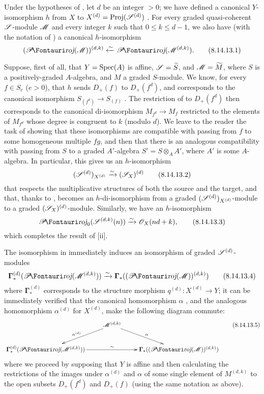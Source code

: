 \begin{remark}[8.14.13]
\label{II.8.14.13}
Under the hypotheses of , let $d$ be an integer $>0$;
we have defined a canonical $Y$-isomorphism $h$ from $X$ to $X^{(d)}=\operatorname{Proj}(\mathscr{S}^{(d)})$ .
For every
graded quasi-coherent $\mathscr{S}$-module $\mathscr{M}$ and every integer $k$ such that $0\leq k\leq d-1$, we also have (with the notation of ) a canonical $h$-isomorphism
\[
\label{II.8.14.13.1}
    (\shProj(\sh{M}))^{(d,k)} \xleftarrow{\sim} \shProj(\sh{M}^{(d,k)}).
\tag{8.14.13.1}
\]

Suppose, first of all, that $Y=\operatorname{Spec}(A)$ is affine, $\mathscr{S}=\widetilde{S}$, and $\mathscr{M}=\widetilde{M}$, where $S$ is a positively-graded $A$-algebra, and $M$ a graded $S$-module.
We know, for every $f\in S_e$ ($e>0$), that $h$ sends $D_+(f)$ to $D_+(f^d)$, and corresponds to the canonical isomorphism $S_{(f^d)}\to S_{(f)}$ .
The restriction of  to $D_+(f^d)$ then corresponds to the canonical di-isomorphism $M_{f^d}\to M_f$ restricted to the elements of $M_{f^d}$ whose degree is congruent to $k$ (modulo $d$).
We leave to the reader the task of showing that these isomorphisms are compatible with passing from $f$ to some homogeneous multiple $fg$, and then that there is an analogous compatibility with passing from $S$ to a graded $A'$-algebra $S'=S\otimes_A A'$, where $A'$ is some $A$-algebra.
In particular, this gives us an $h$-isomorphism
\[
\label{II.8.14.13.2}
    (\mathscr{S}^{(d)})_{X^{(d)}} \xrightarrow{\sim} (\mathscr{S}_X)^{(d)}
\tag{8.14.13.2}
\]
that respects the multiplicative structures of both the source and the target, and that, thanks to , becomes an $h$-di-isomorphism from a graded $(\mathscr{S}^{(d)})_{X^{(d)}}$-module to a graded $(\mathscr{S}_X)^{(d)}$-module.
Similarly, we have an $h$-isomorphism
\[
\label{II.8.14.13.3}
    \shProj_0(\sh{S}^{(d,k)}(n)) \simto \sh{O}_X(nd+k),
\tag{8.14.13.3}
\]
which completes the result of [ii].

The isomorphism in  immediately induces an isomorphism of graded $\mathscr{S}^{(d)}$-modules
\[
\label{II.8.14.13.4}
    \boldsymbol{\Gamma}_*^{(d)}(\shProj(\sh{M}^{(d,k)})) \simto \boldsymbol{\Gamma}_*((\shProj(\sh{M}))^{(d,k)})
\tag{8.14.13.4}
\]
where $\boldsymbol{\Gamma}_*^{(d)}$ corresponds to the structure morphism $q^{(d)}:X^{(d)}\to Y$;
it can be immediately verified that the canonical homomorphism $\alpha$ , and the analogous homomorphism $\alpha^{(d)}$ for $X^{(d)}$, make the following diagram commute:
\[
\label{II.8.14.13.5}
    \xymatrix{
        &\sh{M}^{(d,k)} \ar[dl]_{\alpha^{(d)}} \ar[dr]^{\alpha}&
    \\  \boldsymbol{\Gamma}_*^{(d)}(\shProj(\sh{M}^{(d,k)})) \ar[rr]^{\sim}
        && \boldsymbol{\Gamma}_*((\shProj(\sh{M}))^{(d,k)})
    }
\tag{8.14.13.5}
\]
where we proceed by supposing that $Y$ is affine and then calculating the restrictions of the images under $\alpha^{(d)}$ and $\alpha$ of some single element of $M^{(d,k)}$ to the open subsets $D_+(f^d)$ and $D_+(f)$ (using the same notation as above).
\end{remark}

